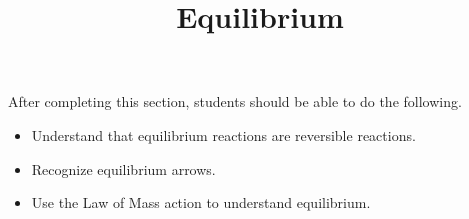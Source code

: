 \documentclass{ximera}
\title{Equilibrium}
\begin{document}
\begin{abstract}
\end{abstract}

\maketitle


After completing this section, students should be able to do the following.

\begin{itemize}
\item Understand that equilibrium reactions are reversible reactions.
\item Recognize equilibrium arrows. 
\item Use the Law of Mass action to understand equilibrium.

\end{itemize}

\end{document}
